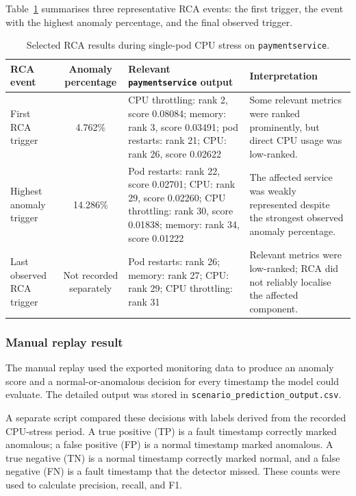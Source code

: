 Table~\ref{tab:paymentservice-cpu-rca} summarises three representative RCA events: the first trigger, the event with the highest anomaly percentage, and the final observed trigger.

\begin{table}[htbp]
    \centering
    \scriptsize
    \caption{Selected RCA results during single-pod CPU stress on \texttt{paymentservice}.}
    \label{tab:paymentservice-cpu-rca}
    \begin{tabularx}{\textwidth}{l c X X}
        \toprule
        \textbf{RCA event} & \textbf{Anomaly percentage} & \textbf{Relevant \texttt{paymentservice} output} & \textbf{Interpretation} \\
        \midrule
        First RCA trigger
        & 4.762\%
        & CPU throttling: rank 2, score 0.08084; memory: rank 3, score 0.03491; pod restarts: rank 21; CPU: rank 26, score 0.02622
        & Some relevant metrics were ranked prominently, but direct CPU usage was low-ranked. \\

        Highest anomaly trigger
        & 14.286\%
        & Pod restarts: rank 22, score 0.02701; CPU: rank 29, score 0.02260; CPU throttling: rank 30, score 0.01838; memory: rank 34, score 0.01222
        & The affected service was weakly represented despite the strongest observed anomaly percentage. \\

        Last observed RCA trigger
        & Not recorded separately
        & Pod restarts: rank 26; memory: rank 27; CPU: rank 29; CPU throttling: rank 31
        & Relevant metrics were low-ranked; RCA did not reliably localise the affected component. \\
        \bottomrule
    \end{tabularx}
\end{table}

\subsubsection{Manual replay result}
The manual replay used the exported monitoring data to produce an anomaly score and a normal-or-anomalous decision for every timestamp the model could evaluate. The detailed output was stored in \texttt{scenario\_prediction\_output.csv}.

A separate script compared these decisions with labels derived from the recorded CPU-stress period. A true positive (TP) is a fault timestamp correctly marked anomalous; a false positive (FP) is a normal timestamp marked anomalous. A true negative (TN) is a normal timestamp correctly marked normal, and a false negative (FN) is a fault timestamp that the detector missed. These counts were used to calculate precision, recall, and F1.

